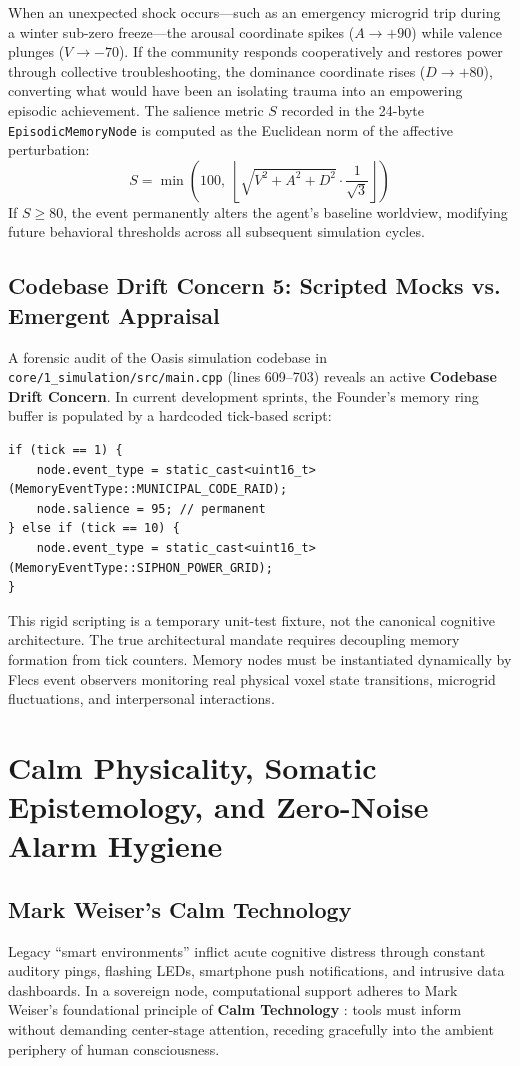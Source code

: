 When an unexpected shock occurs---such as an emergency microgrid trip during a winter sub-zero freeze---the arousal coordinate spikes ($A \to +90$) while valence plunges ($V \to -70$). If the community responds cooperatively and restores power through collective troubleshooting, the dominance coordinate rises ($D \to +80$), converting what would have been an isolating trauma into an empowering episodic achievement. The salience metric $S$ recorded in the 24-byte \texttt{EpisodicMemoryNode} is computed as the Euclidean norm of the affective perturbation:
\begin{equation}
S = \min\left(100, \; \left\lfloor \sqrt{V^2 + A^2 + D^2} \cdot \frac{1}{\sqrt{3}} \right\rfloor \right)
\label{eq:salience_norm}
\end{equation}
If $S \ge 80$, the event permanently alters the agent's baseline worldview, modifying future behavioral thresholds across all subsequent simulation cycles.

\subsection{Codebase Drift Concern 5: Scripted Mocks vs. Emergent Appraisal}
A forensic audit of the Oasis simulation codebase in \texttt{core/1\_simulation/src/main.cpp} (lines 609--703) reveals an active \textbf{Codebase Drift Concern}. In current development sprints, the Founder's memory ring buffer is populated by a hardcoded tick-based script:
\begin{verbatim}
if (tick == 1) {
    node.event_type = static_cast<uint16_t>(MemoryEventType::MUNICIPAL_CODE_RAID);
    node.salience = 95; // permanent
} else if (tick == 10) {
    node.event_type = static_cast<uint16_t>(MemoryEventType::SIPHON_POWER_GRID);
}
\end{verbatim}
This rigid scripting is a temporary unit-test fixture, not the canonical cognitive architecture. The true architectural mandate requires decoupling memory formation from tick counters. Memory nodes must be instantiated dynamically by Flecs event observers monitoring real physical voxel state transitions, microgrid fluctuations, and interpersonal interactions.

\section{Calm Physicality, Somatic Epistemology, and Zero-Noise Alarm Hygiene}
\label{sec:calm_physicality}

\subsection{Mark Weiser's Calm Technology}
Legacy ``smart environments'' inflict acute cognitive distress through constant auditory pings, flashing LEDs, smartphone push notifications, and intrusive data dashboards. In a sovereign node, computational support adheres to Mark Weiser's foundational principle of \textbf{Calm Technology} \cite{weiser1996calm}: tools must inform without demanding center-stage attention, receding gracefully into the ambient periphery of human consciousness.

